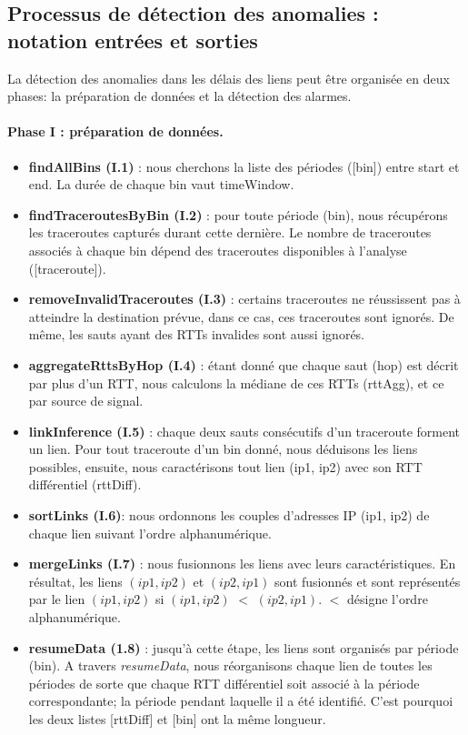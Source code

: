 

\subsection{Processus de détection des anomalies :  notation entrées et sorties} \label{processus-de-detection}
La détection des anomalies dans les délais des liens peut être organisée en deux phases: la préparation de données et la détection des alarmes.
\paragraph{Phase I : préparation de données.}

\begin{itemize}
	\item \textbf{findAllBins (I.1)} : nous cherchons la liste des périodes ({\color{gray}[bin]}) entre  {\color{gray}start} et  {\color{gray}end}. La durée de chaque {\color{gray}bin} vaut  {\color{gray}timeWindow}.
	\item \textbf{findTraceroutesByBin (I.2)} : pour toute période  ({\color{gray}bin}), nous récupérons les traceroutes
	capturés durant cette dernière. Le nombre de traceroutes associés à chaque {\color{gray}bin} dépend
	des traceroutes disponibles à l'analyse  ({\color{gray}[traceroute]}).
	\item \textbf{removeInvalidTraceroutes (I.3)} : certains traceroutes ne réussissent pas à atteindre la destination prévue, dans ce cas, ces traceroutes sont ignorés. De même, les sauts ayant des RTTs invalides
	sont aussi ignorés.
	\item \textbf{aggregateRttsByHop (I.4)} : étant donné que chaque saut  ({\color{gray}hop}) est décrit par plus d'un RTT, nous calculons la médiane de ces RTTs  ({\color{gray}rttAgg}), et ce par source de signal.
	\item \textbf{linkInference (I.5)} : chaque deux sauts consécutifs d'un traceroute forment un lien. Pour
	tout traceroute d'un  {\color{gray}bin} donné, nous déduisons les liens possibles, ensuite, nous caractérisons tout lien  {\color{gray}(ip1, ip2)} avec son RTT différentiel  ({\color{gray}rttDiff}).
	\item \textbf{sortLinks (I.6)}: nous ordonnons les couples d'adresses IP  {\color{gray}(ip1, ip2)} de chaque lien suivant l'ordre alphanumérique. 
	\item \textbf{mergeLinks (I.7)} : nous fusionnons les liens avec leurs caractéristiques. En résultat, les
	liens $ (ip1, ip2) $ et $ (ip2, ip1) $ sont fusionnés et sont représentés par le lien $ (ip1, ip2) $ si $ (ip1, ip2) $ $ < $ $ (ip2, ip1) $. $<$ désigne l'ordre alphanumérique.
	\item \textbf{resumeData (1.8)} : jusqu'à cette étape, les liens sont organisés par période ({\color{gray}bin}). A travers \textit{resumeData}, nous réorganisons chaque lien de toutes les périodes de sorte que chaque RTT différentiel soit associé à la période correspondante; la période pendant laquelle il a été identifié. C'est pourquoi les deux listes  {\color{gray}[rttDiff]} et  {\color{gray}[bin]} ont la même longueur.
	

\end{itemize}
